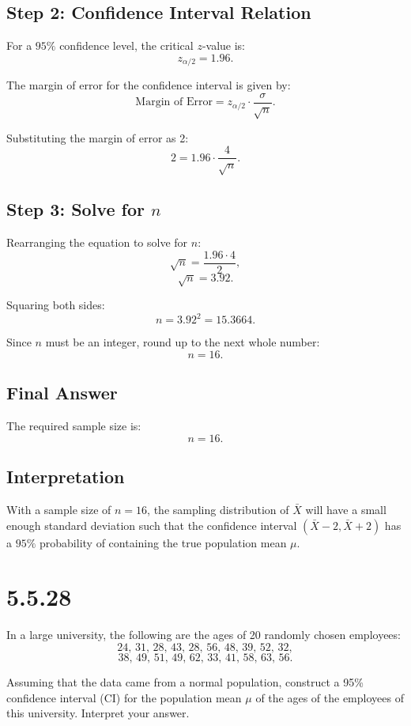 \documentclass{article}
\begin{document}
\subsection*{Step 2: Confidence Interval Relation}
For a \(95\%\) confidence level, the critical \(z\)-value is:
\[
z_{\alpha/2} = 1.96.
\]

The margin of error for the confidence interval is given by:
\[
\text{Margin of Error} = z_{\alpha/2} \cdot \frac{\sigma}{\sqrt{n}}.
\]

Substituting the margin of error as 2:
\[
2 = 1.96 \cdot \frac{4}{\sqrt{n}}.
\]

\subsection*{Step 3: Solve for \(n\)}
Rearranging the equation to solve for \(n\):
\[
\sqrt{n} = \frac{1.96 \cdot 4}{2},
\]
\[
\sqrt{n} = 3.92.
\]

Squaring both sides:
\[
n = 3.92^2 = 15.3664.
\]

Since \(n\) must be an integer, round up to the next whole number:
\[
n = 16.
\]

\subsection*{Final Answer}
The required sample size is:
\[
\boxed{n = 16}.
\]

\subsection*{Interpretation}
With a sample size of \(n = 16\), the sampling distribution of \(\bar{X}\) will have a small enough standard deviation such that the confidence interval \((\bar{X} - 2, \bar{X} + 2)\) has a \(95\%\) probability of containing the true population mean \(\mu\).


\section*{5.5.28}

In a large university, the following are the ages of 20 randomly chosen employees:
\[
24, \, 31, \, 28, \, 43, \, 28, \, 56, \, 48, \, 39, \, 52, \, 32,
\]
\[
38, \, 49, \, 51, \, 49, \, 62, \, 33, \, 41, \, 58, \, 63, \, 56.
\]

Assuming that the data came from a normal population, construct a 95\% confidence interval (CI) for the population mean \(\mu\) of the ages of the employees of this university. Interpret your answer.
\end{document}
